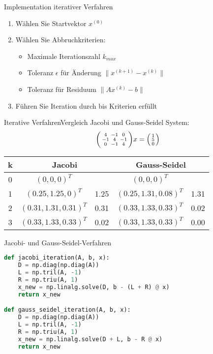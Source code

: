 \begin{KR}{Implementation iterativer Verfahren}
\begin{enumerate}
    \item Wählen Sie Startvektor $x^{(0)}$
    \item Wählen Sie Abbruchkriterien:
        \begin{itemize}
            \item Maximale Iterationszahl $k_{max}$
            \item Toleranz $\epsilon$ für Änderung $\|x^{(k+1)} - x^{(k)}\|$
            \item Toleranz für Residuum $\|Ax^{(k)} - b\|$
        \end{itemize}
    \item Führen Sie Iteration durch bis Kriterien erfüllt
\end{enumerate}
\end{KR}

\begin{example2}{Iterative Verfahren}{Vergleich Jacobi und Gauss-Seidel}
System:
$$\begin{psmallmatrix}
4 & -1 & 0\\
-1 & 4 & -1\\
0 & -1 & 4
\end{psmallmatrix}x = \begin{psmallmatrix}
1\\
5\\
0
\end{psmallmatrix}$$

\begin{center}
\begin{tabular}{c|cc|cc}
k & \multicolumn{2}{c|}{Jacobi} & \multicolumn{2}{c}{Gauss-Seidel}\\
\hline
0 & $(0,0,0)^T$ & & $(0,0,0)^T$ &\\
1 & $(0.25,1.25,0)^T$ & 1.25 & $(0.25,1.31,0.08)^T$ & 1.31\\
2 & $(0.31,1.31,0.31)^T$ & 0.31 & $(0.33,1.33,0.33)^T$ & 0.02\\
3 & $(0.33,1.33,0.33)^T$ & 0.02 & $(0.33,1.33,0.33)^T$ & 0.00
\end{tabular}
\end{center}
\end{example2}

\begin{examplecode}{Jacobi- und Gauss-Seidel-Verfahren}
\begin{lstlisting}[language=Python, style=basesmol]
def jacobi_iteration(A, b, x):
    D = np.diag(np.diag(A))
    L = np.tril(A, -1)
    R = np.triu(A, 1)
    x_new = np.linalg.solve(D, b - (L + R) @ x)
    return x_new

def gauss_seidel_iteration(A, b, x):
    D = np.diag(np.diag(A))
    L = np.tril(A, -1)
    R = np.triu(A, 1)
    x_new = np.linalg.solve(D + L, b - R @ x)
    return x_new
\end{lstlisting}
\end{examplecode}

